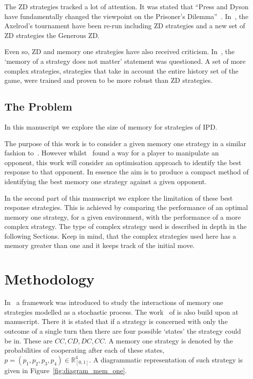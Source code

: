 \documentclass[10pt]{article}
\newcommand{\R}{\mathbb{R}}
\begin{document}
The ZD strategies tracked a lot of attention. It was stated that
``Press and Dyson have fundamentally changed the viewpoint on the Prisoner's
Dilemma''~\cite{Stewart2012}. In~\cite{Stewart2012}, the Axelrod's
tournament have been re-run including ZD strategies and a new set of ZD
strategies the Generous ZD.

Even so, ZD and memory one strategies have also received criticism. In~\cite{Harper2015},
the `memory of a strategy does not matter' statement was questioned. A set of more
complex strategies, strategies that take in account the entire history set of the
game, were trained and proven to be more robust than ZD strategies.

\subsection{The Problem}

In this manuscript we explore the size of memory for strategies of IPD.%

The purpose of this work is to consider a given memory one strategy 
in a similar fashion to~\cite{Press2012}. However whilst~\cite{Press2012} found
a way for a player to manipulate an opponent, this work will consider an
optimisation approach to identify the best response to that opponent.
In essence the aim is to produce a compact method of identifying the best memory
one strategy against a given opponent.

In the second part of this manuscript we explore the limitation of these best response
strategies. This is achieved by comparing the performance of an optimal
memory one strategy, for a given environment, with the performance of a more complex
strategy. The type of complex strategy used is described in depth in the
following Sections. Keep in mind, that the complex strategies used here has a memory
greater than one and it keeps track of the initial move.

\section{Methodology}

In~\cite{Nowak1989} a framework was introduced to study the interactions of memory
one strategies modelled as a stochastic process. The work~\cite{Press2012} of is
also build upon at manuscript. There it is stated that if a strategy
is concerned with only the outcome of a single turn then there are four possible `states'
the strategy could be in. These are \(CC, CD, DC,CC\). A memory one strategy is denoted
by the probabilities of cooperating after each of these states,
\(p=(p_1, p_2, p_3, p_4) \in \R_{[0,1]} ^ 4\). A diagrammatic representation of
such strategy is given in Figure~\ref{fig:diagram_mem_one}.
\end{document}
